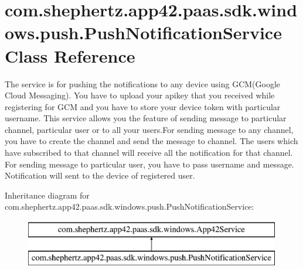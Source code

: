 \hypertarget{classcom_1_1shephertz_1_1app42_1_1paas_1_1sdk_1_1windows_1_1push_1_1_push_notification_service}{\section{com.\+shephertz.\+app42.\+paas.\+sdk.\+windows.\+push.\+Push\+Notification\+Service Class Reference}
\label{classcom_1_1shephertz_1_1app42_1_1paas_1_1sdk_1_1windows_1_1push_1_1_push_notification_service}
}


The service is for pushing the notifications to any device using G\+C\+M(Google Cloud Messaging). You have to upload your apikey that you received while registering for G\+C\+M and you have to store your device token with particular username. This service allows you the feature of sending message to particular channel, particular user or to all your users.\+For sending message to any channel, you have to create the channel and send the message to channel. The users which have subscribed to that channel will receive all the notification for that channel. For sending message to particular user, you have to pass username and message. Notification will sent to the device of registered user.  


Inheritance diagram for com.\+shephertz.\+app42.\+paas.\+sdk.\+windows.\+push.\+Push\+Notification\+Service\+:\begin{figure}[H]
\begin{center}
\leavevmode
\includegraphics[height=2.000000cm]{classcom_1_1shephertz_1_1app42_1_1paas_1_1sdk_1_1windows_1_1push_1_1_push_notification_service}
\end{center}
\end{figure}
